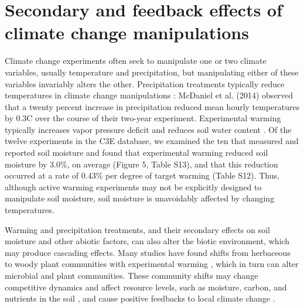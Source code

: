 \documentclass{article}
\begin{document}
\section* {Secondary and feedback effects of climate change manipulations} 
Climate change experiments often seek to manipulate one or two climate variables, usually temperature and precipitation, but manipulating either of these variables invariably alters the other. Precipitation treatments typically reduce temperatures in climate change manipulations \citep{sherry2007,rollinson2012,mcdaniel2014}: McDaniel et al. (2014) observed that a twenty percent increase in precipitation reduced mean hourly temperatures by 0.3\degree C over the course of their two-year experiment. Experimental warming typically increases vapor pressure deficit and reduces soil water content \citep[e.g.,][]{sherry2007,morin2010,pelini2014,templer2016}. Of the twelve experiments in the C3E database, we examined the ten that measured and reported soil moisture and found that experimental warming reduced soil moisture by 3.0\%, on average (Figure 5, Table S13), and that this reduction occurred at a rate of 0.43\% per degree of target warming (Table S12). Thus, although active warming experiments may not be explicitly designed to manipulate soil moisture, soil moisture is unavoidably affected by changing temperatures. 

\par Warming and precipitation treatments, and their secondary effects on soil moisture and other abiotic factors, can also alter the biotic environment, which may produce cascading effects. Many studies have found shifts from herbaceous to woody plant communities with experimental warming \citep[secondary effects][]{rollinson2012, mcdaniel2014,mcdaniel2014b, harte2015}, which in turn can alter microbial and plant communities. These community shifts may change competitive dynamics and affect resource levels, such as moisture, carbon, and nutrients in the soil \citep{mcdaniel2014,mcdaniel2014b, harte2015}, and cause positive feedbacks to local climate change \citep{harte2015}. 
\end{document}
